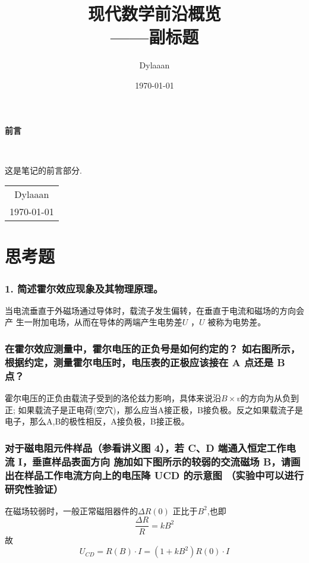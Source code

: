 \documentclass[12pt, a4paper, oneside]{ctexbook}
\title{{\Huge{\textbf{现代数学前沿概览}}}\\——副标题}
\author{Dylaaan}
\date{\today}
\begin{document}
\maketitle

\setcounter{page}{1}

\begin{center}
    \Huge\textbf{前言}
\end{center}~\

这是笔记的前言部分.
~\\
\begin{flushright}
    \begin{tabular}{c}
        Dylaaan \\
        \today
    \end{tabular}
\end{flushright}

\newpage
{}
\setcounter{page}{1}
\tableofcontents
\newpage
\setcounter{page}{1}

\chapter{思考题}
\subsection*{1. 简述霍尔效应现象及其物理原理。}
当电流垂直于外磁场通过导体时，载流子发生偏转，在垂直于电流和磁场的方向会产
生一附加电场，从而在导体的两端产生电势差$ U $ ，$ U $ 被称为电势差。
\subsection*{ 在霍尔效应测量中，霍尔电压的正负号是如何约定的？
    如右图所示，根据约定，测量霍尔电压时，电压表的正极应该接在 A
    点还是 B 点？}
霍尔电压的正负由载流子受到的洛伦兹力影响，具体来说沿$ B\times v $的方向为从负到正; 如果载流子是正电荷(空穴)，那么应当A接正极，B接负极。反之如果载流子是电子，那么A,B的极性相反，A接负极，B接正极。
\subsection*{对于磁电阻元件样品（参看讲义图 4），若 C、D 端通入恒定工作电流 I，垂直样品表面方向
    施加如下图所示的较弱的交流磁场 B，请画出在样品工作电流方向上的电压降 UCD 的示意图
    （实验中可以进行研究性验证）}
在磁场较弱时，一般正常磁阻器件的$ \Delta R(0) $ 正比于$ B^2 $,也即$$
    \frac{\Delta R}{R}=kB^2
$$
故$$
    U_{CD}=R(B)\cdot I=(1+kB^2)R(0)\cdot I
$$
\newpage
\end{document}
